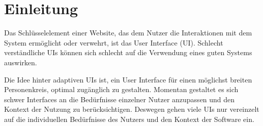 \chapter{Einleitung}
Das Schlüsselelement einer Website, das dem Nutzer die Interaktionen mit dem System ermöglicht oder verwehrt, ist das User Interface (UI).
Schlecht verständliche UIs können sich schlecht auf die Verwendung eines guten Systems auswirken. \cite[S.30]{Am-dUI}

Die Idee hinter adaptiven UIs ist, ein User Interface für einen möglichst breiten Personenkreis, optimal zugänglich zu gestalten.
Momentan gestaltet es sich schwer Interfaces an die Bedürfnisse einzelner Nutzer anzupassen und den Kontext der Nutzung zu berücksichtigen.
Deswegen gehen viele UIs nur vereinzelt auf die individuellen Bedürfnisse des Nutzers und den Kontext der Software ein.


